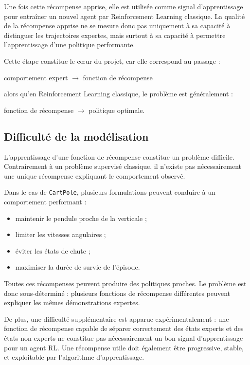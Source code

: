 Une fois cette récompense apprise, elle est utilisée comme signal d’apprentissage pour entraîner un nouvel agent par Reinforcement Learning classique. La qualité de la récompense apprise ne se mesure donc pas uniquement à sa capacité à distinguer les trajectoires expertes, mais surtout à sa capacité à permettre l’apprentissage d’une politique performante.

Cette étape constitue le cœur du projet, car elle correspond au passage :
\begin{center}
comportement expert \(\rightarrow\) fonction de récompense
\end{center}

alors qu’en Reinforcement Learning classique, le problème est généralement :
\begin{center}
fonction de récompense \(\rightarrow\) politique optimale.
\end{center}

\subsection{Difficulté de la modélisation}

L’apprentissage d’une fonction de récompense constitue un problème difficile. Contrairement à un problème supervisé classique, il n’existe pas nécessairement une unique récompense expliquant le comportement observé.

Dans le cas de \texttt{CartPole}, plusieurs formulations peuvent conduire à un comportement performant :
\begin{itemize}
    \item maintenir le pendule proche de la verticale ;
    \item limiter les vitesses angulaires ;
    \item éviter les états de chute ;
    \item maximiser la durée de survie de l’épisode.
\end{itemize}

Toutes ces récompenses peuvent produire des politiques proches. Le problème est donc sous-déterminé : plusieurs fonctions de récompense différentes peuvent expliquer les mêmes démonstrations expertes.

De plus, une difficulté supplémentaire est apparue expérimentalement : une fonction de récompense capable de séparer correctement des états experts et des états non experts ne constitue pas nécessairement un bon signal d’apprentissage pour un agent RL. Une récompense utile doit également être progressive, stable, et exploitable par l’algorithme d’apprentissage.

